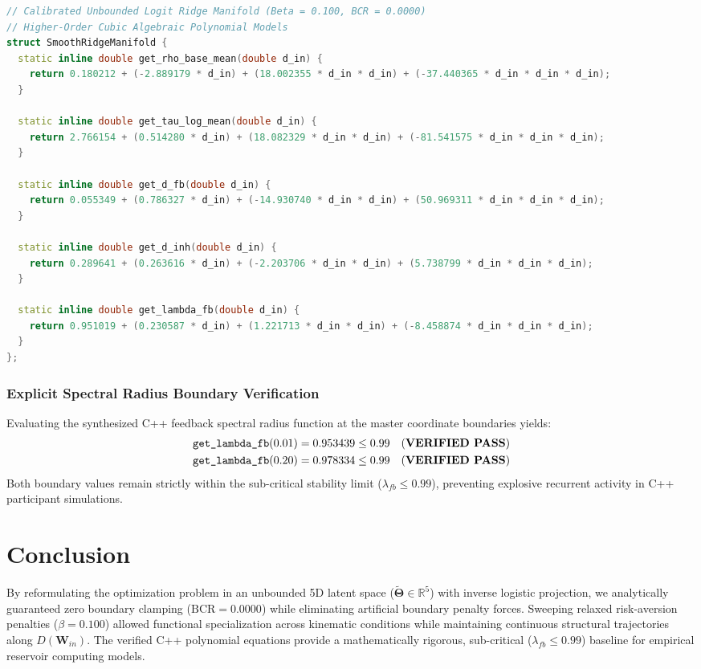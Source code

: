 \documentclass[11pt,a4paper]{article}
\begin{document}
\begin{lstlisting}[language=C++]
// Calibrated Unbounded Logit Ridge Manifold (Beta = 0.100, BCR = 0.0000)
// Higher-Order Cubic Algebraic Polynomial Models
struct SmoothRidgeManifold {
  static inline double get_rho_base_mean(double d_in) {
    return 0.180212 + (-2.889179 * d_in) + (18.002355 * d_in * d_in) + (-37.440365 * d_in * d_in * d_in);
  }

  static inline double get_tau_log_mean(double d_in) {
    return 2.766154 + (0.514280 * d_in) + (18.082329 * d_in * d_in) + (-81.541575 * d_in * d_in * d_in);
  }

  static inline double get_d_fb(double d_in) {
    return 0.055349 + (0.786327 * d_in) + (-14.930740 * d_in * d_in) + (50.969311 * d_in * d_in * d_in);
  }

  static inline double get_d_inh(double d_in) {
    return 0.289641 + (0.263616 * d_in) + (-2.203706 * d_in * d_in) + (5.738799 * d_in * d_in * d_in);
  }

  static inline double get_lambda_fb(double d_in) {
    return 0.951019 + (0.230587 * d_in) + (1.221713 * d_in * d_in) + (-8.458874 * d_in * d_in * d_in);
  }
};
\end{lstlisting}

\subsubsection{Explicit Spectral Radius Boundary Verification}
Evaluating the synthesized C++ feedback spectral radius function at the master coordinate boundaries yields:
\begin{align}
\text{\texttt{get\_lambda\_fb}}(0.01) &= 0.953439 \le 0.99 \quad (\text{\textbf{VERIFIED PASS}}) \\
\text{\texttt{get\_lambda\_fb}}(0.20) &= 0.978334 \le 0.99 \quad (\text{\textbf{VERIFIED PASS}})
\end{align}
Both boundary values remain strictly within the sub-critical stability limit ($\lambda_{fb} \le 0.99$), preventing explosive recurrent activity in C++ participant simulations.

\section{Conclusion}

By reformulating the optimization problem in an unbounded 5D latent space ($\tilde{\boldsymbol{\Theta}} \in \mathbb{R}^5$) with inverse logistic projection, we analytically guaranteed zero boundary clamping ($\text{BCR} = 0.0000$) while eliminating artificial boundary penalty forces. Sweeping relaxed risk-aversion penalties ($\beta = 0.100$) allowed functional specialization across kinematic conditions while maintaining continuous structural trajectories along $D(\mathbf{W}_{in})$. The verified C++ polynomial equations provide a mathematically rigorous, sub-critical ($\lambda_{fb} \le 0.99$) baseline for empirical reservoir computing models.
\end{document}
